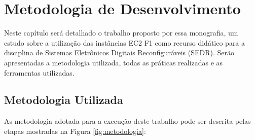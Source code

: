 \chapter{Metodologia de Desenvolvimento}
\label{chap:metodologia}

Neste capítulo será detalhado o trabalho proposto por essa monografia, um estudo sobre a utilização das instâncias EC2 F1 como recurso didático para a disciplina de Sistemas Eletrônicos Digitais Reconfiguráveis (SEDR). Serão apresentadas a metodologia utilizada, todas as práticas realizadas e as ferramentas utilizadas.

\section{Metodologia Utilizada}\label{sec: metodologia-utilizada}

As metodologia adotada para a execução deste trabalho pode ser descrita pelas etapas mostradas na Figura \ref{fig:metodologia}:



\begin{figure}[htb!] 
   	    \captionsetup{width=15cm}%
\end{figure}
    

